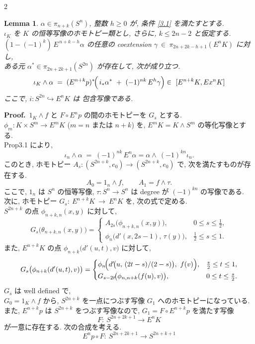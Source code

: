 \documentclass[10pt, leqno]{ltjsarticle}
\newcommand{\into}{\hookrightarrow}
\newcommand{\Ex}{E}        %
\newcommand{\pis}[2]{\pi_{#1}(#2)}       %
\numberwithin{equation}{section}
\theoremstyle{plain}
\newtheorem{lemma}[theorem]{Lemma}
\theoremstyle{definition}
\theoremstyle{remark}
\begin{document}
\begin{paracol}{2}

\begin{lemma}\label{lem:3.5}
$\alpha\in\pis{n+k}{S^n}$, 整数 $h\ge0$ が, 
条件 \eqref{3.1} を満たすとする. \\
$\iota_K$ を $K$ の恒等写像のホモトピー類とし, 
さらに, $k\le 2n-2$ と仮定する. \\
\((1-(-1)^k)\,\Ex^{\,n+k-h}\alpha\) の任意の coextension
\(\gamma\ \in\ \pis{2n+2k-h+1}{\Ex^{n}K}\)
に対し, \\
ある元 $\alpha^{*}\in\pis{2n+2k+1}{S^{2n}}$ が存在して,
次が成り立つ.
\[
\iota_K \wedge \alpha
\;=\; (\Ex^{n+k}p)^{*}\!\Bigl(\, i_*\alpha^{*}\ +\ (-1)^{nk}\,\Ex^{h}\gamma \Bigr)
\in\ [\Ex^{n+k}K, Ex^{n}K]
\]
ここで, $i:S^{2n}\into\Ex^{n}K$ は 包含写像である. 
\end{lemma}

\textbf{Proof.}\ 
$1_K \wedge f$ と $F\circ \Ex^{n}p$ の間のホモトピーを $G_s$ とする. \\
$\phi_m:K\times S^m\to \Ex^{m}K$ ($m=n$ または $n+k$) を,
$\Ex^{m}K=K \wedge S^{m}$ の等化写像とする. \\
Prop3.1 により,
\[
\iota_n \wedge \alpha \;=\;(-1)^{nk}\,\Ex^n\alpha
= \alpha \wedge\ (-1)^{kn} \iota_n .
\]
このとき, ホモトピー
$A_s:(S^{2n+k},e_0)\to (S^{2n+k},e_0)$ で, 
次を満たすものが存在する.
\[
A_0=1_n \wedge f,\qquad A_1=f \wedge \tau.
\]
ここで,  $1_n$ は $S^n$ の恒等写像, $\tau:S^n\to S^n$ は
degree が $(-1)^{kn}$ の写像である. \\
次に, ホモトピー
\(G_s:\ \Ex^{n+k}K\ \longrightarrow\ \Ex^{n}K\)
を, 次の式で定める. \\
$S^{2n+k}$ の点 $\phi_{n+k,n}(x,y)$ に対して,
\[
G_s\bigl(\theta_{n+k,n}(x,y)\bigr)=
\begin{cases}
A_{2s}\!\bigl(\phi_{n+k,n}(x,y)\bigr), & 0\le s\le \tfrac12,\\[2pt]
\phi_{n}\!\bigl(d'(x,2s-1),\,\tau(y)\bigr), & \tfrac12\le s\le1.
\end{cases}
\]
また, $\Ex^{n+k}K$ の点 $\phi_{n+k}\!\bigl(d'(u,t),v\bigr)$ に対して,
\[
G_s\bigl(\phi_{n+k}(d'(u,t),v)\bigr)=
\begin{cases}
\phi_{n}\!\Bigl(d'\!\bigl(u,\,(2t-s)/(2-s)\bigr),\ f(v)\Bigr), & \tfrac{s}{2}\le t\le1,\\[3pt]
G_{s-2t}\!\bigl(\phi_{n,n+k}(f(u),v)\bigr), & 0\le t\le \tfrac{s}{2}.
\end{cases}
\]
\(G_s\) は well defined で, \\
$G_0=1_K \wedge f$ から,
$S^{2n+k}$ を一点につぶす写像 $G_1$ へのホモトピーになっている. \\
また, $\Ex^{n+k}p$ は $S^{2n+k}$ をつぶす写像なので, 
$G_1=F\circ \Ex^{n+k}p$ を満たす写像
\[
F:\ S^{2n+2k+1}\longrightarrow \Ex^{n}K
\]
が一意に存在する. 
次の合成を考える. 
\[
\Ex^{n}p \circ F:\ S^{2n+2k+1}\longrightarrow S^{2n+k+1}
\]


\end{paracol}
\end{document}
